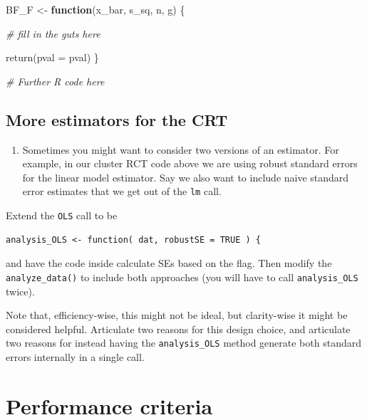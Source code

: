 \documentclass[
]{book}
\newenvironment{Shaded}{\begin{snugshade}}{\end{snugshade}}
\newcommand{\AttributeTok}[1]{\textcolor[rgb]{0.77,0.63,0.00}{#1}}
\newcommand{\CommentTok}[1]{\textcolor[rgb]{0.56,0.35,0.01}{\textit{#1}}}
\newcommand{\ControlFlowTok}[1]{\textcolor[rgb]{0.13,0.29,0.53}{\textbf{#1}}}
\newcommand{\FunctionTok}[1]{\textcolor[rgb]{0.00,0.00,0.00}{#1}}
\newcommand{\NormalTok}[1]{#1}
\newcommand{\OtherTok}[1]{\textcolor[rgb]{0.56,0.35,0.01}{#1}}
\providecommand{\tightlist}{%
  \setlength{\itemsep}{0pt}\setlength{\parskip}{0pt}}
\begin{document}
\begin{Shaded}
\begin{Highlighting}[]
\NormalTok{BF\_F }\OtherTok{\textless{}{-}} \ControlFlowTok{function}\NormalTok{(x\_bar, s\_sq, n, g) \{}
  
  \CommentTok{\# fill in the guts here}
  
  \FunctionTok{return}\NormalTok{(}\AttributeTok{pval =}\NormalTok{ pval)}
\NormalTok{\}}

\CommentTok{\# Further R code here}
\end{Highlighting}
\end{Shaded}

\hypertarget{more-estimators-for-the-crt}{%
\section{More estimators for the CRT}\label{more-estimators-for-the-crt}}

\begin{enumerate}
\def\labelenumi{\arabic{enumi}.}
\setcounter{enumi}{2}
\tightlist
\item
  Sometimes you might want to consider two versions of an estimator. For example, in our cluster RCT code above we are using robust standard errors for the linear model estimator. Say we also want to include naive standard error estimates that we get out of the \texttt{lm} call.
\end{enumerate}

Extend the \texttt{OLS} call to be

\begin{verbatim}
analysis_OLS <- function( dat, robustSE = TRUE ) {
\end{verbatim}

and have the code inside calculate SEs based on the flag. Then modify the \texttt{analyze\_data()} to include both approaches (you will have to call \texttt{analysis\_OLS} twice).

Note that, efficiency-wise, this might not be ideal, but clarity-wise it might be considered helpful. Articulate two reasons for this design choice, and articulate two reasons for instead having the \texttt{analysis\_OLS} method generate both standard errors internally in a single call.

\hypertarget{performance-criteria}{%
\chapter{Performance criteria}\label{performance-criteria}}
\end{document}
